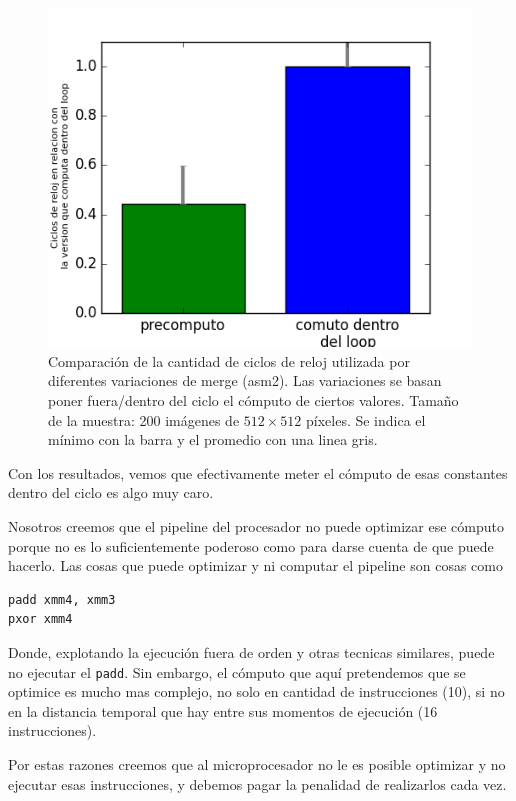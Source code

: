 \begin{figure}[H] 
	\centering
  \includegraphics[scale=0.7]{images/merge-afuera.png}
  \caption{Comparación de la cantidad de ciclos de reloj utilizada por diferentes variaciones de merge (asm2). Las variaciones se basan poner fuera/dentro del ciclo el cómputo de ciertos valores. Tamaño de la muestra: 200 imágenes de $512 \times 512$ píxeles. Se indica el mínimo con la barra y el promedio con una linea gris.}
\end{figure}

Con los resultados, vemos que efectivamente meter el cómputo de esas constantes dentro del ciclo es algo muy caro. 

Nosotros creemos que el pipeline del procesador no puede optimizar ese cómputo porque no es lo suficientemente poderoso como para darse cuenta de que puede hacerlo. Las cosas que puede optimizar y ni computar el pipeline son cosas como


\begin{lstlisting}
padd xmm4, xmm3
pxor xmm4
\end{lstlisting}

Donde, explotando la ejecución fuera de orden y otras tecnicas similares, puede no ejecutar el \texttt{padd}. Sin embargo, el cómputo que aquí pretendemos que se optimice es mucho mas complejo, no solo en cantidad de instrucciones (10), si no en la distancia temporal que hay entre sus momentos de ejecución (16 instrucciones).

Por estas razones creemos que al microprocesador no le es posible optimizar y no ejecutar esas instrucciones, y debemos pagar la penalidad de realizarlos cada vez.






